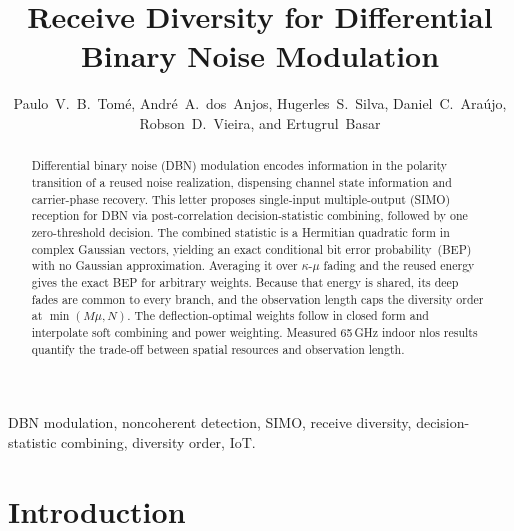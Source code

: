 \documentclass[12pt, draftclsnofoot, onecolumn]{IEEEtran}
\newcommand{\rev}[1]{#1}
\begin{document}
\title{Receive Diversity for Differential Binary Noise Modulation}

\author{Paulo~V.~B.~Tomé, André~A.~dos~Anjos, Hugerles~S.~Silva,
Daniel~C.~Araújo, Robson~D.~Vieira, and Ertugrul~Basar}

\maketitle

\begin{abstract}
Differential binary noise (DBN) modulation encodes information in the polarity transition of a reused noise realization, dispensing channel state information and carrier-phase recovery. This letter proposes single-input multiple-output (SIMO) reception for DBN via post-correlation decision-statistic combining, followed by one zero-threshold decision. \rev{The combined statistic is a Hermitian quadratic form in complex Gaussian vectors, yielding an exact conditional bit error probability~(BEP) with no Gaussian approximation. Averaging it over $\kappa$-$\mu$ fading and the reused energy gives the exact BEP for arbitrary weights. Because that energy is shared, its deep fades are common to every branch, and the observation length caps the diversity order at $\min(M\mu,N)$. The deflection-optimal weights follow in closed form and interpolate soft combining and power weighting.} Measured 65\,GHz indoor \ac{nlos} results quantify the trade-off between spatial resources and observation length.
\end{abstract}

\begin{IEEEkeywords}
DBN modulation, noncoherent detection, SIMO, receive diversity, decision-statistic combining, diversity order, IoT.
\end{IEEEkeywords}

\section{Introduction}
\acresetall
\end{document}
